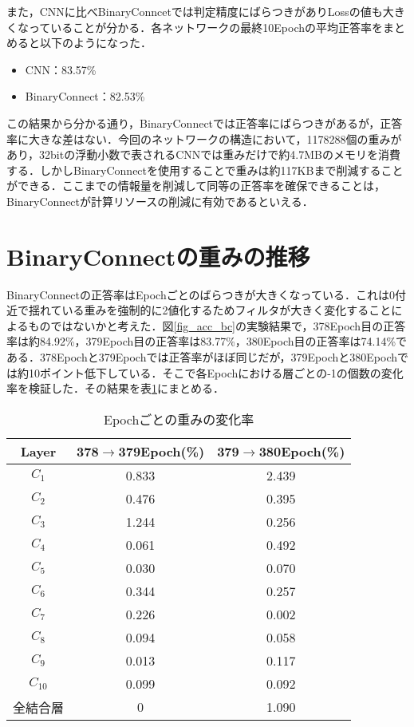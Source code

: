 また，CNNに比べBinaryConncetでは判定精度にばらつきがありLossの値も大きくなっていることが分かる．各ネットワークの最終10Epochの平均正答率をまとめると以下のようになった．
\begin{itemize}
  \item CNN：83.57\%
  \item BinaryConnect：82.53\%
\end{itemize}

この結果から分かる通り，BinaryConnectでは正答率にばらつきがあるが，正答率に大きな差はない．今回のネットワークの構造において，1178288個の重みがあり，32bitの浮動小数で表されるCNNでは重みだけで約4.7MBのメモリを消費する．しかしBinaryConnectを使用することで重みは約117KBまで削減することができる．ここまでの情報量を削減して同等の正答率を確保できることは，BinaryConnectが計算リソースの削減に有効であるといえる．

\section{BinaryConnectの重みの推移}
BinaryConnectの正答率はEpochごとのばらつきが大きくなっている．これは0付近で揺れている重みを強制的に2値化するためフィルタが大きく変化することによるものではないかと考えた．図\ref{fig_acc_bc}の実験結果で，378Epoch目の正答率は約84.92\%，379Epoch目の正答率は83.77\%，380Epoch目の正答率は74.14\%である．378Epochと379Epochでは正答率がほぼ同じだが，379Epochと380Epochでは約10ポイント低下している．そこで各Epochにおける層ごとの-1の個数の変化率を検証した．その結果を表\ref{table_parameter_transition}にまとめる．
\begin{table}
  \caption{Epochごとの重みの変化率}
  \label{table_parameter_transition}
  \centering
  \begin{tabular}{ccc}
    \hline
    Layer & 378$\to$379Epoch(\%) & 379$\to$380Epoch(\%) \\
    \hline \hline
    $C_1$ & 0.833 & 2.439\\
    $C_2$ & 0.476 & 0.395\\
    $C_3$ & 1.244 & 0.256\\
    $C_4$ & 0.061 & 0.492\\
    $C_5$ & 0.030 & 0.070\\
    $C_6$ & 0.344 & 0.257\\
    $C_7$ & 0.226 & 0.002\\
    $C_8$ & 0.094 & 0.058\\
    $C_9$ & 0.013 & 0.117\\
    $C_{10}$ & 0.099 & 0.092\\
    全結合層 & 0 & 1.090\\
    \hline
  \end{tabular}
\end{table}

